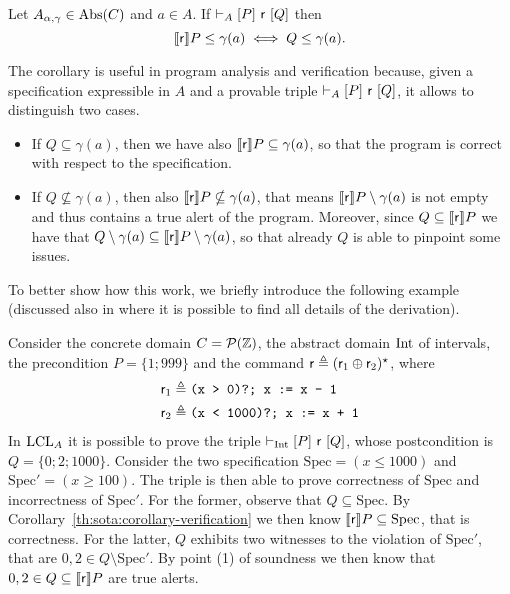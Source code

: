 \begin{corollary}\label{th:sota:corollary-verification}
	Let $A_{\alpha, \gamma} \in \text{\normalfont Abs}(C)$ and $a \in A$. If $\vdash_{A}\nobreak[P]~\mathsf{r}~[Q]$ then
	\[
	\llbracket\mathsf{r}\rrbracket P \le \gamma(a) \iff Q \le \gamma(a) .
	\]
\end{corollary}
The corollary is useful in program analysis and verification because, given a specification expressible in $A$ and a provable triple $\vdash_{A}\nobreak[P]~\mathsf{r}~[Q]$, it allows to distinguish two cases.
\begin{itemize}
	\item If $Q \subseteq \gamma(a)$, then we have also $\llbracket\mathsf{r}\rrbracket P \subseteq \gamma(a)$, so that the program is correct with respect to the specification.
	\item If $Q \nsubseteq \gamma(a)$, then also $\llbracket\mathsf{r}\rrbracket P \nsubseteq \gamma(a)$, that means $\llbracket\mathsf{r}\rrbracket P \setminus \gamma(a)$ is not empty and thus contains a true alert of the program. Moreover, since $Q \subseteq \llbracket\mathsf{r}\rrbracket P$ we have that $Q \setminus \gamma(a) \subseteq \llbracket\mathsf{r}\rrbracket P \setminus \gamma(a)$, so that already $Q$ is able to pinpoint some issues.
\end{itemize}
To better show how this work, we briefly introduce the following example (discussed also in \cite{BGGR21} where it is possible to find all details of the derivation).
\begin{example}
	Consider the concrete domain $C = \mathcal{P}(\mathbb{Z})$, the abstract domain $\text{Int}$ of intervals, the precondition $P = \{ 1; 999 \}$ and the command $\mathsf{r} \triangleq (\mathsf{r}_1 \oplus \mathsf{r}_2)^{\star}$, where
	\begin{align*}
		\mathsf{r}_1 & \triangleq \texttt{(x > 0)?; x := x - 1}    \\
		\mathsf{r}_2 & \triangleq \texttt{(x < 1000)?; x := x + 1}
	\end{align*}
	In $\text{LCL}_A$ it is possible to prove the triple $\vdash_{\text{Int}}\nobreak[P]~\mathsf{r}~[Q]$, whose postcondition is $Q = \{ 0; 2; 1000 \}$. Consider the two specification $\text{Spec}= (x \le 1000)$ and $\text{Spec}' = (x \ge 100)$.
	The triple is then able to prove correctness of $\text{Spec}$ and incorrectness of $\text{Spec}'$.
	For the former, observe that $Q \subseteq \text{Spec}$. By Corollary~\ref{th:sota:corollary-verification} we then know $\llbracket\mathsf{r}\rrbracket P \subseteq \text{Spec}$, that is correctness.
	For the latter, $Q$ exhibits two witnesses to the violation of $\text{Spec}'$, that are $0, 2 \in Q \setminus \text{Spec}'$. By point (1) of soundness we then know that $0, 2 \in Q \subseteq \llbracket\mathsf{r}\rrbracket P$ are true alerts.
\end{example}

